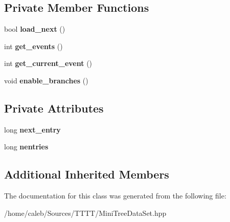 \subsection*{Private Member Functions}
\begin{DoxyCompactItemize}
\item 
\hypertarget{classMiniTreeDataSet_ae681a057d45bfb31fb910915dc6011b9}{}\label{classMiniTreeDataSet_ae681a057d45bfb31fb910915dc6011b9} 
bool {\bfseries load\+\_\+next} ()
\item 
\hypertarget{classMiniTreeDataSet_a4f34767006239e5922f25f4d40ec27be}{}\label{classMiniTreeDataSet_a4f34767006239e5922f25f4d40ec27be} 
int {\bfseries get\+\_\+events} ()
\item 
\hypertarget{classMiniTreeDataSet_a547273d80b32f30c5fd75c4f36d9ca4e}{}\label{classMiniTreeDataSet_a547273d80b32f30c5fd75c4f36d9ca4e} 
int {\bfseries get\+\_\+current\+\_\+event} ()
\item 
\hypertarget{classMiniTreeDataSet_ad0983f643f238f7a710296f5417b21f8}{}\label{classMiniTreeDataSet_ad0983f643f238f7a710296f5417b21f8} 
void {\bfseries enable\+\_\+branches} ()
\end{DoxyCompactItemize}
\subsection*{Private Attributes}
\begin{DoxyCompactItemize}
\item 
\hypertarget{classMiniTreeDataSet_a9a27b77556a42c067fc77bf48d8fd56f}{}\label{classMiniTreeDataSet_a9a27b77556a42c067fc77bf48d8fd56f} 
long {\bfseries next\+\_\+entry}
\item 
\hypertarget{classMiniTreeDataSet_acc544a459206e4c42cdffbdbab2b2b77}{}\label{classMiniTreeDataSet_acc544a459206e4c42cdffbdbab2b2b77} 
long {\bfseries nentries}
\end{DoxyCompactItemize}
\subsection*{Additional Inherited Members}


The documentation for this class was generated from the following file\+:\begin{DoxyCompactItemize}
\item 
/home/caleb/\+Sources/\+T\+T\+T\+T/Mini\+Tree\+Data\+Set.\+hpp\end{DoxyCompactItemize}
